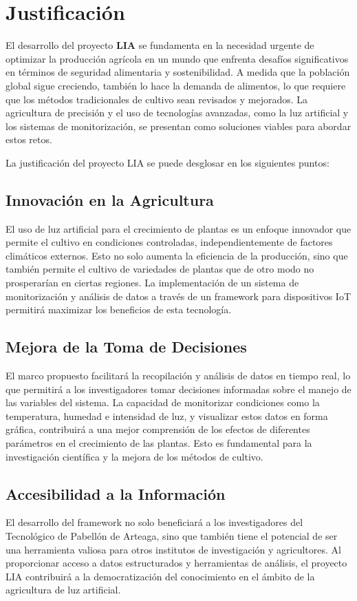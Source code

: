 
\section{Justificación}

El desarrollo del proyecto \textbf{LIA} se fundamenta en la necesidad urgente de optimizar la producción agrícola en un mundo que enfrenta desafíos significativos en términos de seguridad alimentaria y sostenibilidad. A medida que la población global sigue creciendo, también lo hace la demanda de alimentos, lo que requiere que los métodos tradicionales de cultivo sean revisados y mejorados. La agricultura de precisión y el uso de tecnologías avanzadas, como la luz artificial y los sistemas de monitorización, se presentan como soluciones viables para abordar estos retos.

La justificación del proyecto LIA se puede desglosar en los siguientes puntos:

\subsection{Innovación en la Agricultura}
El uso de luz artificial para el crecimiento de plantas es un enfoque innovador que permite el cultivo en condiciones controladas, independientemente de factores climáticos externos. Esto no solo aumenta la eficiencia de la producción, sino que también permite el cultivo de variedades de plantas que de otro modo no prosperarían en ciertas regiones. La implementación de un sistema de monitorización y análisis de datos a través de un framework para dispositivos IoT permitirá maximizar los beneficios de esta tecnología.

\subsection{Mejora de la Toma de Decisiones}
El marco propuesto facilitará la recopilación y análisis de datos en tiempo real, lo que permitirá a los investigadores tomar decisiones informadas sobre el manejo de las variables del sistema. La capacidad de monitorizar condiciones como la temperatura, humedad e intensidad de luz, y visualizar estos datos en forma gráfica, contribuirá a una mejor comprensión de los efectos de diferentes parámetros en el crecimiento de las plantas. Esto es fundamental para la investigación científica y la mejora de los métodos de cultivo.

\subsection{Accesibilidad a la Información}
El desarrollo del framework no solo beneficiará a los investigadores del Tecnológico de Pabellón de Arteaga, sino que también tiene el potencial de ser una herramienta valiosa para otros institutos de investigación y agricultores. Al proporcionar acceso a datos estructurados y herramientas de análisis, el proyecto LIA contribuirá a la democratización del conocimiento en el ámbito de la agricultura de luz artificial.

